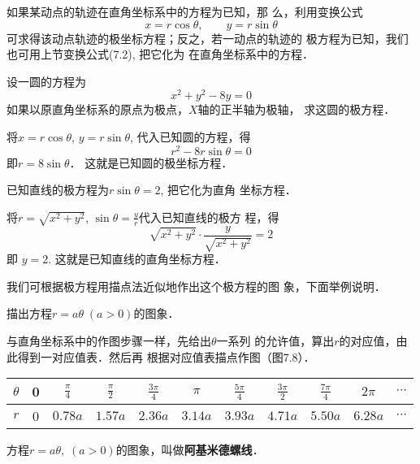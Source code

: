 如果某动点的轨迹在直角坐标系中的方程为已知，那
么，利用变换公式
\[x=r\cos\theta,\qquad y=r\sin\theta\]
可求得该动点轨迹的极坐标方程；反之，若一动点的轨迹的
极方程为已知，我们也可用上节变换公式(7.2), 把它化为
在直角坐标系中的方程．

\begin{example}
    设一圆的方程为
\[x^2+y^2-8y=0\]
如果以原直角坐标系的原点为极点，$X$轴的正半轴为极轴，
求这圆的极方程．
\end{example}

\begin{solution}
    将$x=r\cos\theta$, $y=r\sin\theta $, 代入已知圆的方程，得
\[r^2-8r\sin\theta =0\]
即$r=8\sin\theta$．
这就是已知圆的极坐标方程．
\end{solution}

\begin{example}
    已知直线的极方程为$r\sin\theta=2$, 把它化为直角
    坐标方程．
\end{example}

\begin{solution}
    将$r=\sqrt{x^2+y^2}$, $\sin\theta =\frac{y}{r}$代入已知直线的极方
程，得
\[\sqrt{x^2+y^2}\cdot \frac{y}{\sqrt{x^2+y^2}}=2\]
即
$y=2$. 
这就是已知直线的直角坐标方程．
\end{solution}

我们可根据极方程用描点法近似地作出这个极方程的图
象，下面举例说明．

\begin{example}
    描出方程$r=a\theta\; (a>0)$的图象．
\end{example}

\begin{solution}
    与直角坐标系中的作图步骤一样，先给出$\theta$一系列
的允许值，算出$r$的对应值，由此得到一对应值表．然后再
根据对应值表描点作图（图7.8）．
\begin{center}
\begin{tabular}{c|cccccccccc}
\hline
$\theta$ & 0&$\frac{\pi}{4}$&$\frac{\pi}{2}$&$\frac{3\pi}{4}$&$\pi$&$\frac{5\pi}{4}$&$\frac{3\pi}{2}$&$\frac{7\pi}{4}$&$2\pi$&$\cdots$\\
\hline
$r$ & 0&  $0.78a$ & $1.57a$ & $2.36a$ & $3.14a$ & $3.93a$ & $4.71a$ & $5.50a$ & $6.28a$ & $\cdots$\\
\hline
\end{tabular}
\end{center}
\begin{figure}[htp]
    \centering
{}
    \caption{}
\end{figure}

方程$r=a\theta,\; (a>0)$的图象，叫做\textbf{阿基米德螺线}．
\end{solution}

